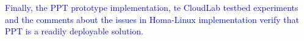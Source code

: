 \documentclass[12pt,one-column]{article}
\begin{document}
\textcolor{blue}{Finally, the PPT prototype implementation, te CloudLab testbed experiments and the comments about the issues in Homa-Linux implementation verify that PPT is a readily deployable solution.
}



\end{document}
